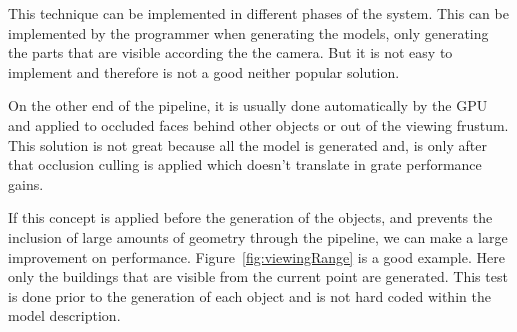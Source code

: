 This technique can be implemented in different phases of the system. This can be implemented by the programmer when generating the models, only generating the parts that are visible according the the camera. But it is not easy to implement and therefore is not a good neither popular solution.

On the other end of the pipeline, it is usually done automatically by the GPU and applied to occluded faces behind other objects or out of the viewing frustum. This solution is not great because all the model is generated and, is only after that occlusion culling is applied which doesn't translate in grate performance gains.

If this concept is applied before the generation of the objects, and prevents the inclusion of large amounts of geometry through the pipeline, we can make a large improvement on performance. Figure~\ref{fig:viewingRange} is a good example. Here only the buildings that are visible from the current point are generated. This test is done prior to the generation of each object and is not hard coded within the model description.



		